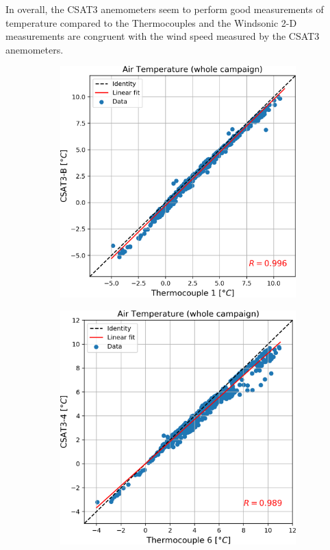 In overall, the CSAT3 anemometers seem to perform good measurements of temperature compared to the Thermocouples and the Windsonic 2-D measurements are congruent with the wind speed measured by the CSAT3 anemometers.

\begin{figure}[!ht]
    \centering
    \begin{subfigure}[b]{0.48\textwidth}
        \includegraphics[width=\textwidth]{fig/chapter_4/csat3b_vs_T1.png}
      \label{fig:csat3b_vs_TC1}
    \end{subfigure}
    \quad
    \begin{subfigure}[b]{0.48\textwidth}
        \includegraphics[width=\textwidth]{fig/chapter_4/csat4_vs_T6.png}

\end{subfigure}
\end{figure}
